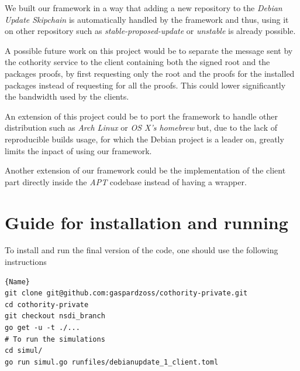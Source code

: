\documentclass[11pt, upma4paper, twoside, openany, parskip=half]{book}
\begin{document}
We built our framework in a way that adding a new repository to the \emph{Debian Update Skipchain} is automatically handled by the framework and thus, using it on other repository such as \emph{stable-proposed-update} or \emph{unstable} is already possible.

A possible future work on this project would be to separate the message sent by the cothority service to the client containing both the signed root and the packages proofs, by first requesting only the root and the proofs for the installed packages instead of requesting for all the proofs. This could lower significantly the bandwidth used by the clients.

An extension of this project could be to port the framework to handle other distribution such as \emph{Arch Linux} or \emph{OS X's homebrew} but, due to the lack of reproducible builds usage, for which the Debian project is a leader on, greatly limits the inpact of using our framework.

Another extension of our framework could be the implementation of the client part directly inside the \emph{APT} codebase instead of having a wrapper.


{}


\chapter{Guide for installation and running}
To install and run the final version of the code, one should use the following instructions

\begin{lstlisting}[frame=none,basicstyle=\ttfamily]{Name}
git clone git@github.com:gaspardzoss/cothority-private.git
cd cothority-private
git checkout nsdi_branch
go get -u -t ./...
# To run the simulations
cd simul/
go run simul.go runfiles/debianupdate_1_client.toml
\end{lstlisting}
\end{document}
